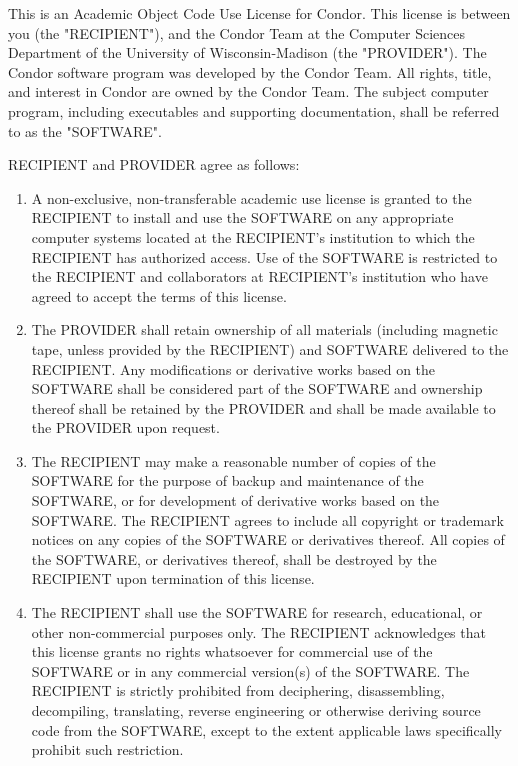 This is an Academic Object Code Use License for Condor. This license
is between you (the "RECIPIENT"), and the Condor Team at the Computer
Sciences Department of the University of Wisconsin-Madison (the
"PROVIDER"). The Condor software program was developed by the Condor
Team. All rights, title, and interest in Condor are owned by the
Condor Team. The subject computer program, including executables and
supporting documentation, shall be referred to as the "SOFTWARE".

RECIPIENT and PROVIDER agree as follows:

\begin{enumerate}

\item A non-exclusive, non-transferable academic use license is
granted to the RECIPIENT to install and use the SOFTWARE on any
appropriate computer systems located at the RECIPIENT's institution
to which the RECIPIENT has authorized access. Use of the SOFTWARE is
restricted to the RECIPIENT and collaborators at RECIPIENT's
institution who have agreed to accept the terms of this license.

\item The PROVIDER shall retain ownership of all materials (including
magnetic tape, unless provided by the RECIPIENT) and SOFTWARE
delivered to the RECIPIENT. Any modifications or derivative works
based on the SOFTWARE shall be considered part of the SOFTWARE and
ownership thereof shall be retained by the PROVIDER and shall be made
available to the PROVIDER upon request.

\item The RECIPIENT may make a reasonable number of copies of the
SOFTWARE for the purpose of backup and maintenance of the SOFTWARE, or
for development of derivative works based on the SOFTWARE. The
RECIPIENT agrees to include all copyright or trademark notices on any
copies of the SOFTWARE or derivatives thereof. All copies of the
SOFTWARE, or derivatives thereof, shall be destroyed by the RECIPIENT
upon termination of this license.

\item The RECIPIENT shall use the SOFTWARE for research, educational,
or other non-commercial purposes only. The RECIPIENT acknowledges that
this license grants no rights whatsoever for commercial use of the
SOFTWARE or in any commercial version(s) of the SOFTWARE. The
RECIPIENT is strictly prohibited from deciphering, disassembling,
decompiling, translating, reverse engineering or otherwise deriving
source code from the SOFTWARE, except to the extent applicable laws
specifically prohibit such restriction.


\end{enumerate}
